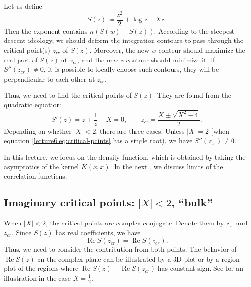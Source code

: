 \documentclass[letterpaper,11pt,oneside,reqno]{book}
\numberwithin{equation}{chapter}  %
\theoremstyle{definition}
\begin{document}
Let us define
\begin{equation*}
	S(z)\coloneqq
	\frac{z^2}{2}+\log z -X z.
\end{equation*}
Then the exponent contains $n \left( S(w)-S(z) \right)$.
According to the steepest descent ideology, we
should deform the integration contours
to pass through the critical point(s) $z_{cr}$ of $S(z)$.
Moreover, the new $w$ contour should maximize the real part of $S(z)$
at $z_{cr}$, and the new $z$ contour should minimize it.
If $S''(z_{cr})\ne 0$, it is possible to locally choose such contours,
they will be perpendicular to each other at $z_{cr}$.

Thus, we need to find the critical points of $S(z)$.
They are found from the quadratic equation:
\begin{equation}
	\label{lecture6:eq:critical-points}
	S'(z)=z+\frac{1}{z}-X=0,\qquad
	z_{cr}=\frac{X\pm \sqrt{X^2-4}}{2}.
\end{equation}
Depending on whether $|X|<2$, there are three cases.
Unless $|X|=2$ (when equation \eqref{lecture6:eq:critical-points} has a single root), we have
$S''(z_{cr})\ne 0$.

In this lecture, we focus on the density function, which is obtained by taking the asymptotics of the
kernel $K(x,x)$. In the next ,
we discuss limits of the correlation functions.

\subsection{Imaginary critical points: $|X|<2$, ``bulk''}
\label{lecture6:sub:imaginary-critical-points}

When $|X|<2$, the critical points are complex conjugate.
Denote them by $z_{cr}$ and $\overline{z_{cr}}$.
Since $S(z)$ has real coefficients, we have
\begin{equation*}
	\operatorname{Re}S(z_{cr})=\operatorname{Re}S(\overline{z_{cr}}).
\end{equation*}
Thus, we need to consider the contribution from both points.
The behavior of $\operatorname{Re}S(z)$ on the complex plane
can be illustrated by a 3D plot or by a region plot of the regions
where $\operatorname{Re}S(z)-\operatorname{Re}S(z_{cr})$ has constant sign.
See  for an illustration in the case $X=\frac{1}{2}$.
\end{document}
